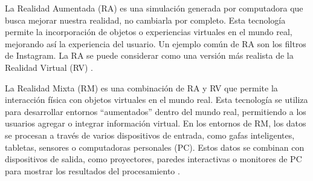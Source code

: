 \documentclass[a4paper,10pt]{article}
\begin{document}
{		La Realidad Aumentada (RA) es una simulación generada por computadora que busca mejorar nuestra realidad, no cambiarla por completo. Esta tecnología permite la incorporación de objetos o experiencias virtuales en el mundo real, mejorando así la experiencia del usuario. Un ejemplo común de RA son los filtros de Instagram. La RA se puede considerar como una versión más realista de la Realidad Virtual (RV) \parencite{gonzalez2022metaverso}.\par
		La Realidad Mixta (RM) es una combinación de RA y RV que permite la interacción física con objetos virtuales en el mundo real. Esta tecnología se utiliza para desarrollar entornos “aumentados” dentro del mundo real, permitiendo a los usuarios agregar o integrar información virtual. En los entornos de RM, los datos se procesan a través de varios dispositivos de entrada, como gafas inteligentes, tabletas, sensores o computadoras personales (PC). Estos datos se combinan con dispositivos de salida, como proyectores, paredes interactivas o monitores de PC para mostrar los resultados del procesamiento \parencite{ortega2022realidad}.\par}
\end{document}
